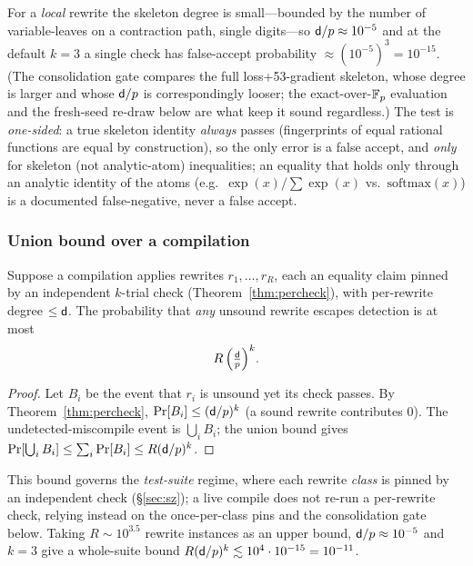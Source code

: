 \documentclass[sigplan,10pt,review]{acmart}
\begin{document}
For a \emph{local} rewrite the skeleton degree is small---bounded by the
number of variable-leaves on a contraction path, single digits---so
$\mathsf{d}/p\approx 10^{-5}$ and at the default $k=3$ a single check has
false-accept probability $\approx(10^{-5})^{3}=10^{-15}$. (The
consolidation gate compares the full loss+53-gradient skeleton, whose
degree is larger and whose $\mathsf{d}/p$ is correspondingly looser; the
exact-over-$\mathbb{F}_{p}$ evaluation and the fresh-seed re-draw below are what
keep it sound regardless.) The test is \emph{one-sided}: a true
skeleton identity \emph{always} passes (fingerprints of equal rational
functions are equal by construction), so the only error is a false
accept, and \emph{only} for skeleton (not analytic-atom) inequalities;
an equality that holds only through an analytic identity of the atoms
(e.g.\ $\exp(x)/\sum\exp(x)$ vs.\ $\mathrm{softmax}(x)$) is a documented
false-negative, never a false accept.

\subsubsection*{Union bound over a compilation}

\begin{theorem}\label{thm:union}
Suppose a compilation applies rewrites $r_1,\dots,r_R$, each an equality
claim pinned by an independent $k$-trial check
(Theorem~\ref{thm:percheck}), with per-rewrite degree $\le\mathsf{d}$. The
probability that \emph{any} unsound rewrite escapes detection is at most
\[
   R\,\Big(\tfrac{\mathsf{d}}{p}\Big)^{k}.
\]
\end{theorem}

\begin{proof}
Let $B_i$ be the event that $r_i$ is unsound yet its check passes. By
Theorem~\ref{thm:percheck}, $\Pr[B_i]\le(\mathsf{d}/p)^{k}$ (a sound rewrite
contributes $0$). The undetected-miscompile event is $\bigcup_i B_i$;
the union bound gives $\Pr[\bigcup_i B_i]\le\sum_i\Pr[B_i]\le
R(\mathsf{d}/p)^{k}$.
\end{proof}

This bound governs the \emph{test-suite} regime, where each rewrite
\emph{class} is pinned by an independent check (\S\ref{sec:sz}); a live
compile does not re-run a per-rewrite check, relying instead on the
once-per-class pins and the consolidation gate below. Taking $R\sim
10^{3.5}$ rewrite instances as an upper bound, $\mathsf{d}/p\approx10^{-5}$ and
$k=3$ give a whole-suite bound $R(\mathsf{d}/p)^{k}\lesssim
10^{4}\cdot10^{-15}=10^{-11}$.
\end{document}
